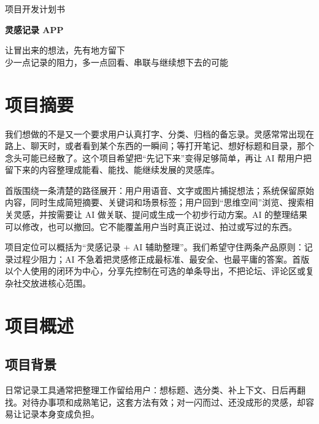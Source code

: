 \documentclass[UTF8,a4paper,12pt]{ctexart}
\begin{document}
\begin{titlepage}
  \centering
  \vspace*{2.8cm}
  {\large 项目开发计划书\par}
  \vspace{1.0cm}
  {\Huge\bfseries\color{ink} 灵感记录 APP\par}
  \vspace{4.8cm}
  \begin{minipage}[c][1.8cm][c]{0.82\textwidth}
    \centering\small
    让冒出来的想法，先有地方留下\\[5pt]
    少一点记录的阻力，多一点回看、串联与继续想下去的可能
  \end{minipage}
  \vfill
  \vspace*{1.3cm}
\end{titlepage}

\section*{项目摘要}
我们想做的不是又一个要求用户认真打字、分类、归档的备忘录。灵感常常出现在路上、聊天时，或者看到某个东西的一瞬间；等打开笔记、想好标题和目录，那个念头可能已经散了。这个项目希望把“先记下来”变得足够简单，再让 AI 帮用户把留下来的内容整理成能看、能找、能继续发展的灵感库。

首版围绕一条清楚的路径展开：用户用语音、文字或图片捕捉想法；系统保留原始内容，同时生成简短摘要、关键词和场景标签；用户回到“思维空间”浏览、搜索相关灵感，并按需要让 AI 做关联、提问或生成一个初步行动方案。AI 的整理结果可以修改，也可以撤回。它不能覆盖用户当时真正说过、拍过或写过的东西。

项目定位可以概括为“灵感记录 + AI 辅助整理”。我们希望守住两条产品原则：记录过程少阻力；AI 不急着把灵感修正成最标准、最安全、也最平庸的答案。首版以个人使用的闭环为中心，分享先控制在可选的单条导出，不把论坛、评论区或复杂社交放进核心范围。

\tableofcontents
\newpage

\section{项目概述}

\subsection{项目背景}
日常记录工具通常把整理工作留给用户：想标题、选分类、补上下文、日后再翻找。对待办事项和成熟笔记，这套方法有效；对一闪而过、还没成形的灵感，却容易让记录本身变成负担。
\end{document}
